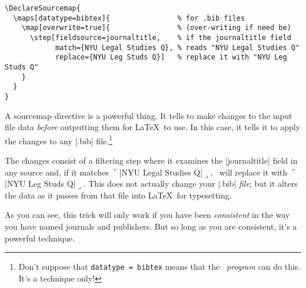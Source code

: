 \begin{Verbatim}
\DeclareSourcemap{
  \maps[datatype=bibtex]{                % for .bib files
    \map[overwrite=true]{                % (over-writing if need be)
      \step[fieldsource=journaltitle,    % if the journaltitle field
            match={NYU Legal Studies Q}, % reads "NYU Legal Studies Q"
            replace={NYU Leg Studs Q}]   % replace it with "NYU Leg Studs Q"
    }
  }
}
\end{Verbatim}

A sourcemap directive is a powerful thing. It tells  to make changes to the input
file data \emph{before} outputting them for \LaTeX\ to use. In this
case, it tells it to apply the changes to any |.bib|
file.\footnote{Don't suppose that \texttt{datatype = bibtex} means that
  the \bibtex\ \emph{program} can do this. It's a 
  technique only!}

 The changes consist of a filtering step where it examines the
|journaltitle| field in any source and, if it matches 
$\ulcorner$|NYU Legal Studies Q|$\lrcorner$, \biblatex\ will replace it with 
$\ulcorner$|NYU Leg Studs Q|$\lrcorner$. This does not actually change your 
|.bib| \emph{file}; but it alters the data as it passes from that file into
\LaTeX\ for typesetting.

As you can see, this trick will only work if you have been
\emph{consistent} in the way you have named journals and
publishers. But so long as you are consistent, it's a powerful
technique.



